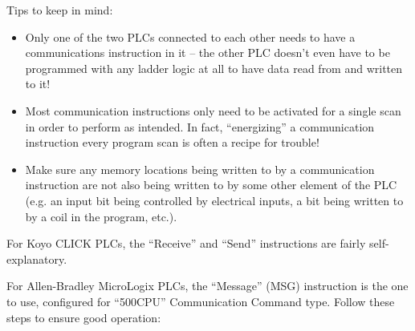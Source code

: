 \vskip 10pt

\noindent
Tips to keep in mind:

\begin{itemize}
\item{} Only one of the two PLCs connected to each other needs to have a communications instruction in it -- the other PLC doesn't even have to be programmed with any ladder logic at all to have data read from and written to it!
\item{} Most communication instructions only need to be activated for a single scan in order to perform as intended.  In fact, ``energizing'' a communication instruction every program scan is often a recipe for trouble!
\item{} Make sure any memory locations being written to by a communication instruction are not also being written to by some other element of the PLC (e.g. an input bit being controlled by electrical inputs, a bit being written to by a coil in the program, etc.).
\end{itemize}








For Koyo CLICK PLCs, the ``Receive'' and ``Send'' instructions are fairly self-explanatory.  

\vskip 20pt

For Allen-Bradley MicroLogix PLCs, the ``Message'' (MSG) instruction is the one to use, configured for ``500CPU'' Communication Command type.  Follow these steps to ensure good operation:

